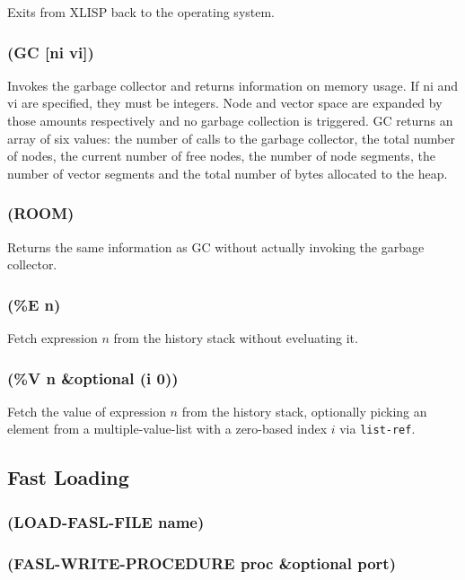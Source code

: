 \documentclass[11pt]{article}
\begin{document}
Exits from XLISP back to the operating system.
\subsubsection{(GC [ni vi])}
\label{sec-4-41-14}

Invokes the garbage collector and returns information on memory
usage.  If ni and vi are specified, they must be integers.  Node and
vector space are expanded by those amounts respectively and no
garbage collection is triggered.  GC returns an array of six values:
the number of calls to the garbage collector, the total number of
nodes, the current number of free nodes, the number of node segments,
the number of vector segments and the total number of bytes allocated
to the heap.
\subsubsection{(ROOM)}
\label{sec-4-41-15}

Returns the same information as GC without actually invoking the
garbage collector.
\subsubsection{(\%E n)}
\label{sec-4-41-16}

Fetch expression $n$ from the history stack without eveluating it.
\subsubsection{(\%V n \&optional (i 0))}
\label{sec-4-41-17}

Fetch the value of expression $n$ from the history stack, optionally
picking an element from a multiple-value-list with a zero-based
index $i$ via \verb|list-ref|.
\subsection{Fast Loading}
\label{sec-4-42}

\subsubsection{(LOAD-FASL-FILE name)}
\label{sec-4-42-1}

\subsubsection{(FASL-WRITE-PROCEDURE proc \&optional port)}
\label{sec-4-42-2}
\end{document}
